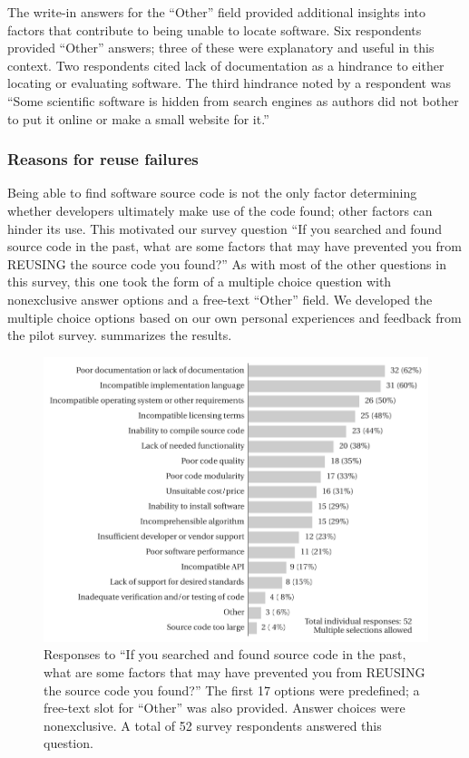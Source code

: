 \documentclass{casicswhitepaper}
\begin{document}
The write-in answers for the ``Other'' field provided additional insights into factors that contribute to being unable to locate software.  Six respondents provided ``Other'' answers; three of these were explanatory and useful in this context.  Two respondents cited lack of documentation as a hindrance to either locating or evaluating software.  The third hindrance noted by a respondent was ``Some scientific software is hidden from search engines as authors did not bother to put it online or make a small website for it.''


\subsubsection{Reasons for reuse failures}
\label{reuse-failures}

Being able to find software source code is not the only factor determining whether developers ultimately make use of the code found; other factors can hinder its use.  This motivated our survey question ``If you searched and found source code in the past, what are some factors that may have prevented you from REUSING the source code you found?''  As with most of the other questions in this survey, this one took the form of a multiple choice question with nonexclusive answer options and a free-text ``Other'' field.  We developed the multiple choice options based on our own personal experiences and feedback from the pilot survey.   summarizes the results.

\begin{figure}[t]
  \centering
  \includegraphics{files/plots/hindrance-to-reusing-src.pdf}
  \vspace*{-1.5ex}
  \caption{Responses to ``If you searched and found source code in the past, what are some factors that may have prevented you from REUSING the source code you found?''  The first 17 options were predefined; a free-text slot for ``Other'' was also provided.  Answer choices were nonexclusive.  A total of 52 survey respondents answered this question.}
  \label{hindrance-to-reusing-src}
\end{figure}
\end{document}
